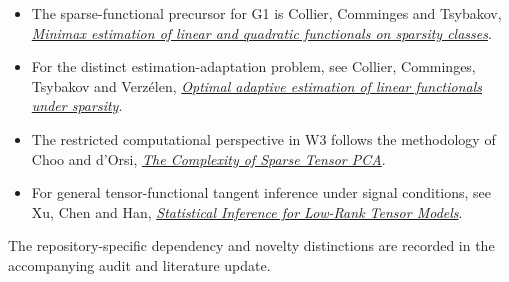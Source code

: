 \documentclass[
  10pt,
]{article}
\providecommand{\tightlist}{%
  \setlength{\itemsep}{0pt}\setlength{\parskip}{0pt}}
\begin{document}
\begin{itemize}
\tightlist
\item
  The sparse-functional precursor for G1 is Collier, Comminges and
  Tsybakov, \href{https://arxiv.org/abs/1502.00665}{\emph{Minimax
  estimation of linear and quadratic functionals on sparsity classes}}.
\item
  For the distinct estimation-adaptation problem, see Collier,
  Comminges, Tsybakov and Verzélen,
  \href{https://arxiv.org/abs/1611.09744}{\emph{Optimal adaptive
  estimation of linear functionals under sparsity}}.
\item
  The restricted computational perspective in W3 follows the methodology
  of Choo and d'Orsi, \href{https://arxiv.org/abs/2106.06308}{\emph{The
  Complexity of Sparse Tensor PCA}}.
\item
  For general tensor-functional tangent inference under signal
  conditions, see Xu, Chen and Han,
  \href{https://arxiv.org/abs/2501.16223}{\emph{Statistical Inference
  for Low-Rank Tensor Models}}.
\end{itemize}

The repository-specific dependency and novelty distinctions are recorded
in the accompanying audit and literature update.
\end{document}
